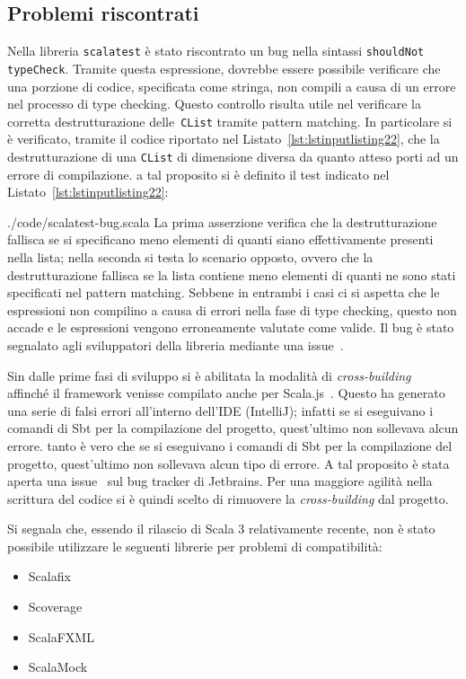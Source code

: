 \subsection{Problemi riscontrati}\label{subsec:problemi-riscontrati}
Nella libreria \texttt{scalatest} è stato riscontrato un bug nella sintassi \texttt{shouldNot typeCheck}.
Tramite questa espressione, dovrebbe essere possibile verificare che una porzione di codice, specificata come stringa,
non compili a causa di un errore nel processo di type checking.
Questo controllo risulta utile nel verificare la corretta destrutturazione delle~\texttt{CList} tramite pattern
matching.
In particolare si è verificato, tramite il codice riportato nel Listato~\ref{lst:lstinputlisting22}, che la
destrutturazione di una \texttt{CList} di dimensione diversa da quanto atteso porti ad un errore di compilazione.
a tal proposito si è definito il test indicato nel Listato~\ref{lst:lstinputlisting22}:

{./code/scalatest-bug.scala}
La prima asserzione verifica che la destrutturazione fallisca se si specificano meno elementi di quanti siano
effettivamente presenti nella lista;
nella seconda si testa lo scenario opposto, ovvero che la destrutturazione fallisca se la lista contiene meno elementi
di quanti ne sono stati specificati nel pattern matching.
Sebbene in entrambi i casi ci si aspetta che le espressioni non compilino a causa di errori nella fase di type checking,
questo non accade e le espressioni vengono erroneamente valutate come valide.
Il bug è stato segnalato agli sviluppatori della libreria mediante una issue~\cite{scalatest-bug}.

Sin dalle prime fasi di sviluppo si è abilitata la modalità di \textit{cross-building}~\cite{cross-building} affinché il
framework venisse compilato anche per Scala.js~\cite{scalajs}.
Questo ha generato una serie di falsi errori all'interno dell'IDE (IntelliJ);
infatti se si eseguivano i comandi di Sbt per la compilazione del progetto, quest'ultimo non sollevava alcun errore.
tanto è vero che se si eseguivano i comandi di Sbt per la compilazione del progetto, quest'ultimo non sollevava alcun
tipo di errore.
A tal proposito è stata aperta una issue~\cite{intellij-issue} sul bug tracker di Jetbrains.
Per una maggiore agilità nella scrittura del codice si è quindi scelto di rimuovere la \textit{cross-building} dal
progetto.

Si segnala che, essendo il rilascio di Scala 3 relativamente recente, non è stato possibile utilizzare
le seguenti librerie per problemi di compatibilità:
\begin{itemize}
    \item Scalafix
    \item Scoverage
    \item ScalaFXML
    \item ScalaMock
\end{itemize}

